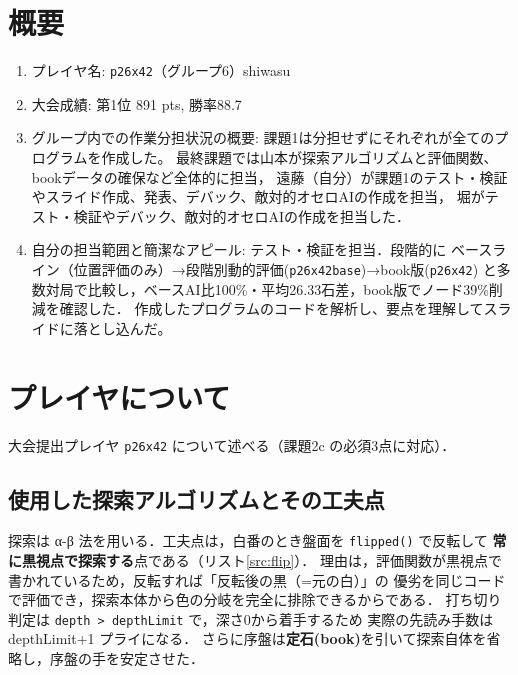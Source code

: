\documentclass[11pt,a4j]{ujarticle} %
\begin{document}
\section{概要}
\begin{screen}
\begin{enumerate}
\setlength{\itemsep}{2pt}
\setlength{\parskip}{0pt}
\item プレイヤ名: {\verb+p26x42+}（グループ6）shiwasu
\item 大会成績: 第1位  891 pts, 勝率88.7%
\item グループ内での作業分担状況の概要: 
      課題1は分担せずにそれぞれが全てのプログラムを作成した。
      最終課題では山本が探索アルゴリズムと評価関数、bookデータの確保など全体的に担当，
      遠藤（自分）が課題1のテスト・検証やスライド作成、発表、デバック、敵対的オセロAIの作成を担当，
      堀がテスト・検証やデバック、敵対的オセロAIの作成を担当した．
\item 自分の担当範囲と簡潔なアピール: テスト・検証を担当．段階的に
      ベースライン（位置評価のみ）→段階別動的評価({\verb+p26x42base+})→book版({\verb+p26x42+})
      と多数対局で比較し，ベースAI比100\%・平均26.33石差，book版でノード39\%削減を確認した．
      作成したプログラムのコードを解析し、要点を理解してスライドに落とし込んだ。
\end{enumerate}
\end{screen}

\section{プレイヤについて}

大会提出プレイヤ {\verb+p26x42+} について述べる（課題2c の必須3点に対応）．

\subsection{使用した探索アルゴリズムとその工夫点}

探索は α-β 法を用いる．工夫点は，白番のとき盤面を {\verb+flipped()+} で反転して
\textbf{常に黒視点で探索する}点である（リスト\ref{src:flip}）．
理由は，評価関数が黒視点で書かれているため，反転すれば「反転後の黒（=元の白）」の
優劣を同じコードで評価でき，探索本体から色の分岐を完全に排除できるからである．
打ち切り判定は {\verb+depth > depthLimit+} で，深さ0から着手するため
実際の先読み手数は depthLimit+1 プライになる．
さらに序盤は\textbf{定石(book)}を引いて探索自体を省略し，序盤の手を安定させた．
\end{document}
